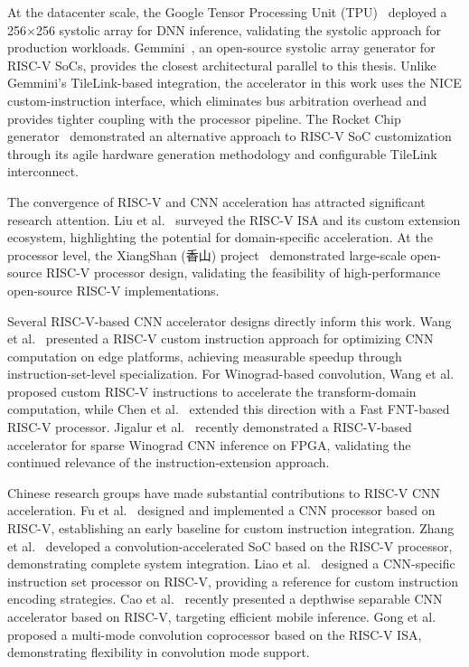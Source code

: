 At the datacenter scale, the Google Tensor Processing Unit (TPU)~\cite{TPU} deployed a 256$\times$256 systolic array for DNN inference, validating the systolic approach for production workloads. Gemmini~\cite{GEMMINI}, an open-source systolic array generator for RISC-V SoCs, provides the closest architectural parallel to this thesis. Unlike Gemmini's TileLink-based integration, the accelerator in this work uses the NICE custom-instruction interface, which eliminates bus arbitration overhead and provides tighter coupling with the processor pipeline. The Rocket Chip generator~\cite{ROCKETCHIP} demonstrated an alternative approach to RISC-V SoC customization through its agile hardware generation methodology and configurable TileLink interconnect.

The convergence of RISC-V and CNN acceleration has attracted significant research attention. Liu et al.~\cite{liu2021riscv} surveyed the RISC-V ISA and its custom extension ecosystem, highlighting the potential for domain-specific acceleration. At the processor level, the XiangShan (香山) project~\cite{wang2023xiangshan} demonstrated large-scale open-source RISC-V processor design, validating the feasibility of high-performance open-source RISC-V implementations.

Several RISC-V-based CNN accelerator designs directly inform this work. Wang et al.~\cite{wang2024riscvcnn} presented a RISC-V custom instruction approach for optimizing CNN computation on edge platforms, achieving measurable speedup through instruction-set-level specialization. For Winograd-based convolution, Wang et al.~\cite{wang2021winograd} proposed custom RISC-V instructions to accelerate the transform-domain computation, while Chen et al.~\cite{chen2024fnt} extended this direction with a Fast FNT-based RISC-V processor. Jigalur et al.~\cite{jigalur2025sparse} recently demonstrated a RISC-V-based accelerator for sparse Winograd CNN inference on FPGA, validating the continued relevance of the instruction-extension approach.

Chinese research groups have made substantial contributions to RISC-V CNN acceleration. Fu et al.~\cite{fu2020processor} designed and implemented a CNN processor based on RISC-V, establishing an early baseline for custom instruction integration. Zhang et al.~\cite{zhang2021soc} developed a convolution-accelerated SoC based on the RISC-V processor, demonstrating complete system integration. Liao et al.~\cite{liao2021isa} designed a CNN-specific instruction set processor on RISC-V, providing a reference for custom instruction encoding strategies. Cao et al.~\cite{cao2024cnn} recently presented a depthwise separable CNN accelerator based on RISC-V, targeting efficient mobile inference. Gong et al.~\cite{gong2023multimode} proposed a multi-mode convolution coprocessor based on the RISC-V ISA, demonstrating flexibility in convolution mode support.

